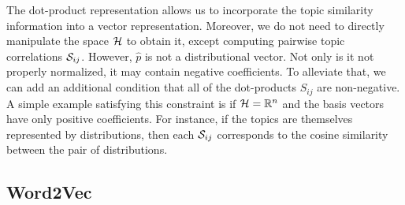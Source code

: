 The dot-product representation allows us to incorporate the topic
similarity information into a vector representation. Moreover, we do
not need to directly manipulate the space ${\mathcal H}$ to obtain it, except
computing pairwise topic correlations ${\mathcal S}_{ij}$. However,
$\widehat{p}$ is not a distributional vector. Not only is it not
properly normalized, it may contain negative coefficients. To
alleviate that, we can add an additional condition that all of the
dot-products $S_{ij}$ are non-negative. A simple example satisfying
this constraint is if ${\mathcal H}={\mathbb R}^n$ and the basis vectors have only
positive coefficients. For instance, if the topics are
themselves represented by distributions, then each ${\mathcal S}_{ij}$
corresponds to the cosine similarity between the pair of
distributions.

\subsection{Word2Vec}